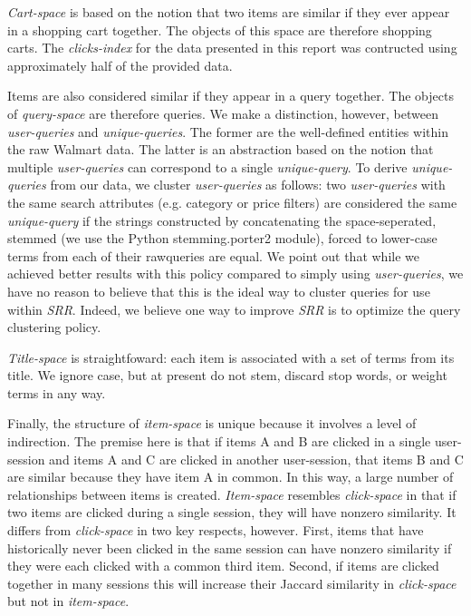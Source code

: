 \documentclass{article}
\begin{document}
{\em Cart-space} is based on the notion that two items are similar if they ever
appear in a shopping cart together. The objects of this space are therefore
shopping carts. The {\em clicks-index} for the data presented in this report was
contructed using approximately half of the provided data.

Items are also considered similar if they appear in a query together. The
objects of {\em query-space} are therefore queries. We make a distinction,
however, between {\em user-queries} and {\em unique-queries}. The former are the
well-defined entities within the raw Walmart data. The latter is an abstraction
based on the notion that multiple {\em user-queries} can correspond to a single
{\em unique-query}. To derive {\em unique-queries} from our data, we cluster
{\em user-queries} as follows: two {\em user-queries} with the same search
attributes (e.g. category or price filters) are considered the same {\em
unique-query} if the strings constructed by concatenating the space-seperated,
stemmed (we use the Python stemming.porter2 module), forced to lower-case terms
from each of their rawqueries are equal. We point out that while we achieved
better results with this policy compared to simply using {\em user-queries}, we
have no reason to believe that this is the ideal way to cluster queries for use
within {\em SRR}. Indeed, we believe one way to improve {\em SRR} is to optimize 
the query clustering policy.

{\em Title-space} is straightfoward: each item is associated with a set of terms
from its title. We ignore case, but at present do not stem, discard stop words,
or weight terms in any way. 

Finally, the structure of {\em item-space} is unique because it involves a level
of indirection. The premise here is that if items A and B are clicked in a
single user-session and items A and C are clicked in another user-session, that
items B and C are similar because they have item A in common. In this way, a
large number of relationships between items is created. {\em Item-space}
resembles {\em click-space} in that if two items are clicked during a single
session, they will have nonzero similarity. It differs from {\em click-space} in
two key respects, however. First, items that have historically never been
clicked in the same session can have nonzero similarity if they were each
clicked with a common third item. Second, if items are clicked together in many
sessions this will increase their Jaccard similarity in {\em click-space} but
not in {\em item-space}.
\end{document}
